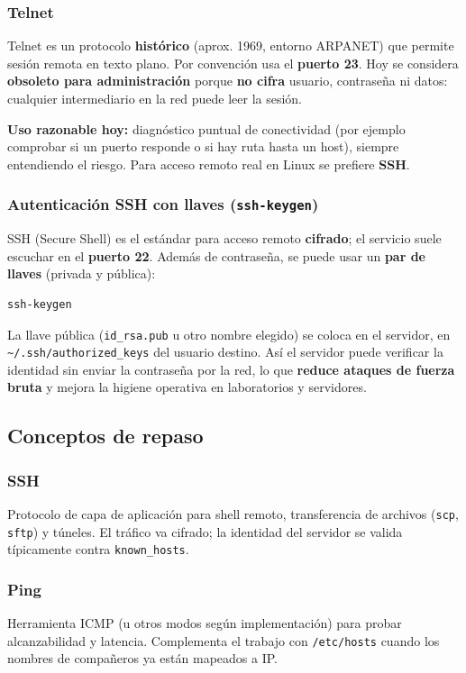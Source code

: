 \documentclass[11pt, letterpaper]{article}
\begin{document}
\subsubsection{Telnet}
\label{sec:org7d57aaa}
Telnet es un protocolo \textbf{histórico} (aprox. 1969, entorno ARPANET) que permite sesión remota en texto plano. Por convención usa el \textbf{puerto 23}. Hoy se considera \textbf{obsoleto para administración} porque \textbf{no cifra} usuario, contraseña ni datos: cualquier intermediario en la red puede leer la sesión.

\textbf{Uso razonable hoy:} diagnóstico puntual de conectividad (por ejemplo comprobar si un puerto responde o si hay ruta hasta un host), siempre entendiendo el riesgo. Para acceso remoto real en Linux se prefiere \textbf{SSH}.
\subsubsection{Autenticación SSH con llaves (\texttt{ssh-keygen})}
\label{sec:org477fdc7}
SSH (Secure Shell) es el estándar para acceso remoto \textbf{cifrado}; el servicio suele escuchar en el \textbf{puerto 22}. Además de contraseña, se puede usar un \textbf{par de llaves} (privada y pública):

\begin{verbatim}
ssh-keygen
\end{verbatim}

La llave pública (\texttt{id\_rsa.pub} u otro nombre elegido) se coloca en el servidor, en \texttt{\textasciitilde{}/.ssh/authorized\_keys} del usuario destino. Así el servidor puede verificar la identidad sin enviar la contraseña por la red, lo que \textbf{reduce ataques de fuerza bruta} y mejora la higiene operativa en laboratorios y servidores.
\subsection{Conceptos de repaso}
\label{sec:org9b64459}

\subsubsection{SSH}
\label{sec:orgc054038}
Protocolo de capa de aplicación para shell remoto, transferencia de archivos (\texttt{scp}, \texttt{sftp}) y túneles. El tráfico va cifrado; la identidad del servidor se valida típicamente contra \texttt{known\_hosts}.
\subsubsection{Ping}
\label{sec:org392ffce}
Herramienta ICMP (u otros modos según implementación) para probar alcanzabilidad y latencia. Complementa el trabajo con \texttt{/etc/hosts} cuando los nombres de compañeros ya están mapeados a IP.
\end{document}

